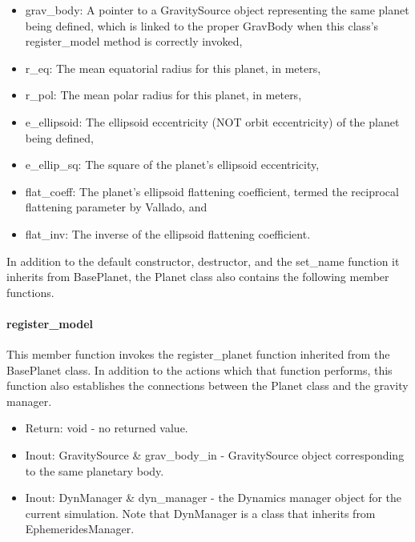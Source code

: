 \begin{itemize}
\item{grav\_body:} A pointer to a GravitySource object representing the same
planet being defined, which is linked to the proper GravBody when this class's
register\_model method is correctly invoked,

\item{r\_eq:} The mean equatorial radius for this planet, in meters,

\item{r\_pol:} The mean polar radius for this planet, in meters,

\item{e\_ellipsoid:} The ellipsoid eccentricity (NOT orbit eccentricity) of
the planet being defined,

\item{e\_ellip\_sq:} The square of the planet's ellipsoid eccentricity,

\item{flat\_coeff:} The planet's ellipsoid flattening coefficient, termed the
reciprocal flattening parameter by Vallado, and

\item{flat\_inv:} The inverse of the ellipsoid flattening coefficient.
\end{itemize}

In addition to the default constructor, destructor, and the set\_name function
it inherits from BasePlanet, the Planet class also contains the following
member functions.

\paragraph{register\_model}

This member function invokes the register\_planet function
inherited from the BasePlanet class. In addition to the actions which that
function performs, this function also establishes the connections between the
Planet class and the gravity manager.

\begin{itemize}
\item{Return:} void - no returned value.
\item{Inout:} GravitySource \& grav\_body\_in - GravitySource object corresponding
to the same planetary body.
\item{Inout:} DynManager \& dyn\_manager - the Dynamics manager object for
the current simulation. Note that DynManager is a class that inherits from
EphemeridesManager.
\end{itemize}

